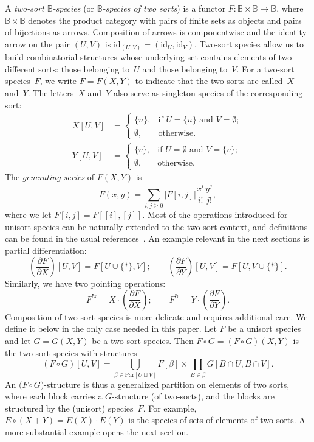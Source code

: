 \documentclass[a4paper,11pt,UKenglish]{article}
\newcommand{\BB}{\mathbb{B}}
\newcommand{\Set}{E}
\newcommand{\Par}{\mathrm{Par}}
\newcommand{\id}{\mathrm{id}}
\newcommand{\ddy}[1]{\displaystyle{\frac{\partial{#1}}{\partial Y}}}
\newcommand{\ddx}[1]{\displaystyle{\frac{\partial{#1}}{\partial X}}}
\newcommand{\pointX}{^{\bullet_X}}
\newcommand{\pointY}{^{\bullet_Y}}
\theoremstyle{definition}
\begin{document}
A \emph{two-sort $\BB$-species} (or \emph{$\BB$-species of two sorts})
is a functor $F:\BB\times\BB\to\BB$, where $\BB\times\BB$ denotes
the product category with pairs of finite sets as objects and pairs
of bijections as arrows.
Composition of arrows is componentwise and the identity arrow on the
pair $(U,V)$ is $\id_{(U,V)}=(\id_U,\id_V)$.
Two-sort species allow us to build combinatorial structures whose
underlying set contains elements of two different sorts: those
belonging to~$U$ and those belonging to~$V$.
For a two-sort species~$F$, we write $F=F(X,Y)$ to indicate that the
two sorts are called~$X$ and~$Y$. The letters~$X$ and~$Y$ also serve as
singleton species of the corresponding sort:
\begin{align*}
X[U,V]&=\begin{cases}
\{u\},
& \text{if $U=\{u\}$ and $V=\emptyset$};\\
\emptyset, & \text{otherwise}.
\end{cases}\\[1.5ex]
Y[U,V]&=\begin{cases}
\{v\},
& \text{if $U=\emptyset$ and $V=\{v\}$};\\
\emptyset, & \text{otherwise}.
\end{cases}
\end{align*}
The \emph{generating series} of $F(X,Y)$ is
$$
F(x,y)=
\sum_{i,j\ge 0}|F[i,j]|\frac{x^i}{i!}\frac{y^j}{j!},
$$
where we let $F[i,j]=F[[i],[j]]$.
Most of the operations introduced for unisort species can be naturally
extended to the two-sort context, and definitions can be
found in the usual references~\cite{BLL,Cl}. An example relevant
in the next sections is partial differentiation:
$$
\left(\ddx{F}\right)[U,V]=F[U\cup\{*\},V];
\qquad
\left(\ddy{F}\right)[U,V]=F[U,V\cup\{*\}].
$$
Similarly, we have two pointing operations:
\begin{equation}\label{eq_pointing}
F^{\pointX}=X\cdot\left(\ddx{F}\right);
\qquad
F^{\pointY}=Y\cdot\left(\ddy{F}\right).
\end{equation}
Composition of two-sort species is more delicate and requires
additional care. We define it below in the only case needed in
this paper.
Let $F$ be a unisort species and let $G=G(X,Y)$ be a two-sort species.
Then $F\circ G=(F\circ G)(X,Y)$ is the two-sort species with structures
$$
\left(F\circ G\right)[U,V]=
\bigcup_{\beta\in\Par[U \sqcup V]}F[\beta]\times\prod_{B\in\beta}G[B\cap U,B\cap V].
$$
An $\bigl(F\circ G\bigr)$-structure is thus a generalized
partition on elements of two sorts, where each block carries a
$G$-structure (of two-sorts), and the blocks are structured by the
(unisort) species~$F$.
For example, $\Set\circ(X+Y)=\Set(X)\cdot\Set(Y)$ is the species of
sets of elements of two sorts. A more substantial example opens the
next section.
\end{document}
